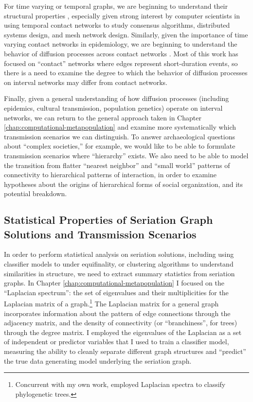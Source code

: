 For time varying or temporal graphs, we are beginning to understand their structural properties \citep{nicosia2013graph,nicosia2012components}, especially given strong interest by computer scientists in using temporal contact networks to study consensus algorithms, distributed systems design, and mesh network design.  Similarly, given the importance of time varying contact networks in epidemiology, we are beginning to understand the behavior of diffusion processes across contact networks \citep{liu2013contagion,pare2017epidemic,liu2014social,uribe2019non,santoro2011time}.  Most of this work has focused on ``contact'' networks where edges represent short-duration events, so there is a need to examine the degree to which the behavior of diffusion processes on interval networks may differ from contact networks.  

Finally, given a general understanding of how diffusion processes (including epidemics, cultural transmission, population genetics) operate on interval networks, we can return to the general approach taken in Chapter \ref{chap:computational-metapopulation} and examine more systematically which transmission scenarios we can distinguish.  To answer archaeological questions about ``complex societies,'' for example, we would like to be able to formulate transmission scenarios where ``hierarchy'' exists.  We also need to be able to model the transition from flatter ``nearest neighbor'' and ``small world'' patterns of connectivity to hierarchical patterns of interaction, in order to examine hypotheses about the origins of hierarchical forms of social organization, and its potential breakdown.

\subsection{Statistical Properties of Seriation Graph Solutions and Transmission Scenarios}\label{conc:sec:future-seriation-structure}

In order to perform statistical analysis on seriation solutions, including using classifier models to under equifinality, or clustering algorithms to understand similarities in structure, we need to extract summary statistics from seriation graphs.  In Chapter \ref{chap:computational-metapopulation} I focused on the ``Laplacian spectrum'':  the set of eigenvalues and their multiplicities for the Laplacian matrix of a graph.\footnote{Concurrent with my own work, \citet{lewitus2016characterizing} employed Laplacian spectra to classify phylogenetic trees.}  The Laplacian matrix for a general graph incorporates information about the pattern of edge connections through the adjacency matrix, and the density of connectivity (or ``branchiness'', for trees) through the degree matrix.  I employed the eigenvalues of the Laplacian as a set of independent or predictor variables that I used to train a classifier model, measuring the ability to cleanly separate different graph structures and ``predict'' the true data generating model underlying the seriation graph.  

